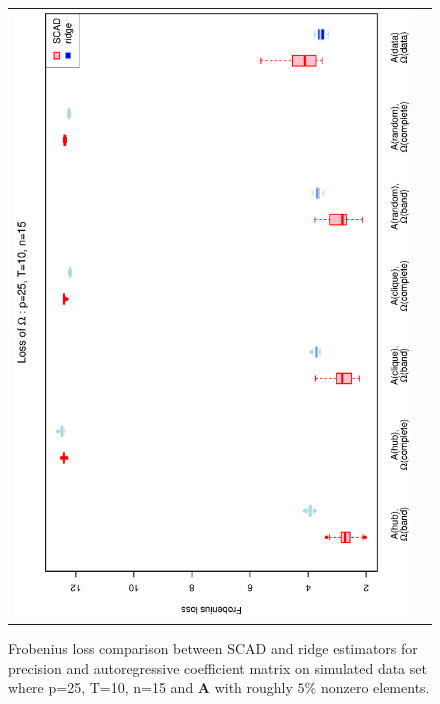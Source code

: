 \begin{figure}[h!]
\begin{tabular}{cc}
\includegraphics[scale=0.45,angle=270]{LossOmega25T10N15_5.eps}
\end{tabular}
\caption{Frobenius loss comparison between SCAD and ridge estimators for precision and autoregressive coefficient matrix on simulated data set where p=25, T=10, n=15  and $\mathbf{A}$ with roughly $5\%$ nonzero elements.}
\label{figSM:Loss25T10N15_5}
\end{figure}


